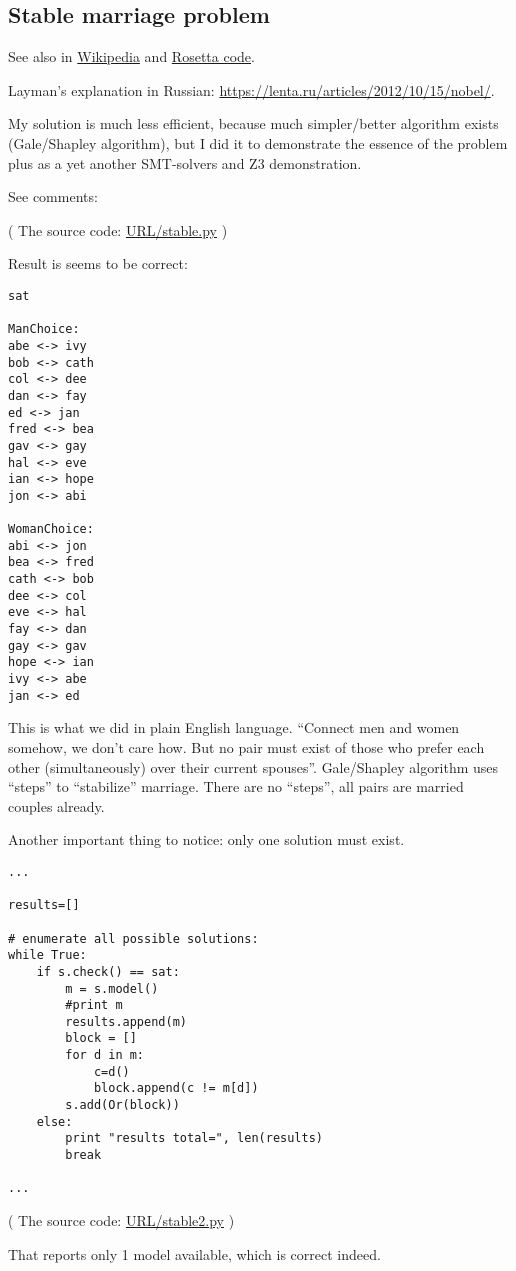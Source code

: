 \subsection{Stable marriage problem}

\renewcommand{\CURPATH}{other/stable_marriage}

See also in
\href{https://en.wikipedia.org/wiki/Stable_marriage_problem}{Wikipedia} and 
\href{https://rosettacode.org/wiki/Stable_marriage_problem}{Rosetta code}.

Layman's explanation in Russian: \url{https://lenta.ru/articles/2012/10/15/nobel/}.

My solution is much less efficient, because much simpler/better algorithm exists (Gale/Shapley algorithm),
but I did it to demonstrate the essence of the problem plus as a yet another SMT-solvers and Z3 demonstration.

See comments:



( The source code: \url{URL/stable.py} )

Result is seems to be correct:

\begin{lstlisting}
sat

ManChoice:
abe <-> ivy
bob <-> cath
col <-> dee
dan <-> fay
ed <-> jan
fred <-> bea
gav <-> gay
hal <-> eve
ian <-> hope
jon <-> abi

WomanChoice:
abi <-> jon
bea <-> fred
cath <-> bob
dee <-> col
eve <-> hal
fay <-> dan
gay <-> gav
hope <-> ian
ivy <-> abe
jan <-> ed
\end{lstlisting}

This is what we did in plain English language.
``Connect men and women somehow, we don't care how.
But no pair must exist of those who prefer each other (simultaneously) over their current spouses''.
Gale/Shapley algorithm uses ``steps'' to ``stabilize'' marriage.
There are no ``steps'', all pairs are married couples already.

Another important thing to notice: only one solution must exist.

\begin{lstlisting}
...

results=[]

# enumerate all possible solutions:
while True:
    if s.check() == sat:
        m = s.model()
        #print m
        results.append(m)
        block = []
        for d in m:
            c=d()
            block.append(c != m[d])
        s.add(Or(block))
    else:
        print "results total=", len(results)
        break

...
\end{lstlisting}

( The source code: \url{URL/stable2.py} )

That reports only 1 model available, which is correct indeed.

